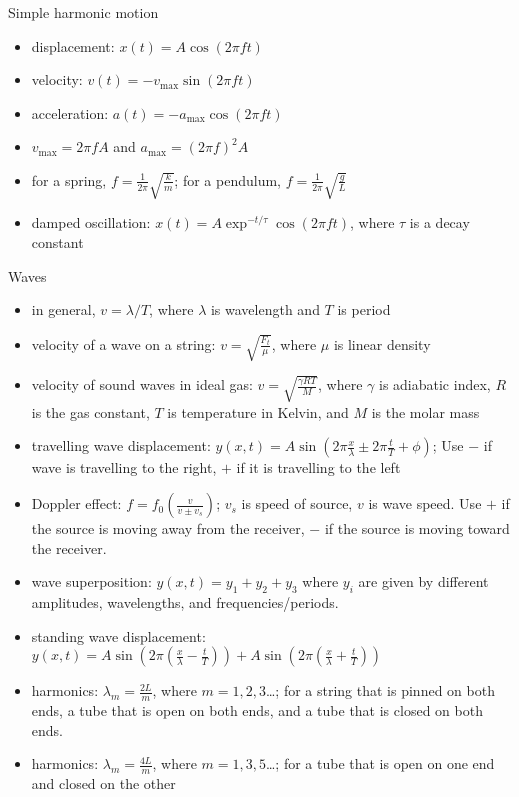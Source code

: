 \documentclass[11pt,letterpaper]{article}
\begin{document}
Simple harmonic motion
\begin{itemize}
\item displacement: $x(t)=A\cos(2\pi{f}t)$
\item velocity: $v(t)=-v_{\mathrm{max}}\sin(2\pi{f}t)$
\item acceleration: $a(t)=-a_{\mathrm{max}}\cos(2\pi{f}t)$
\item $v_{\mathrm{max}}=2\pi{f}A$ and $a_{\mathrm{max}}=(2\pi{f})^2A$
\item for a spring, $f=\frac{1}{2\pi}\sqrt{\frac{k}{m}}$; for a pendulum, $f=\frac{1}{2\pi}\sqrt{\frac{g}{L}}$
\item damped oscillation: $x(t)=A\exp^{-t/\tau}\cos(2\pi{f}t)$, where $\tau$ is a decay constant
\end{itemize}
Waves
\begin{itemize}
\item in general, $v=\lambda/T$, where $\lambda$ is wavelength and $T$ is period
\item velocity of a wave on a string: $v=\sqrt{\frac{F_t}{\mu}}$, where $\mu$ is linear density
\item velocity of sound waves in ideal gas: $v=\sqrt{\frac{\gamma{RT}}{M}}$, where $\gamma$ is adiabatic index, $R$ is the gas constant, $T$ is temperature in Kelvin, and $M$ is the molar mass
\item travelling wave displacement: $y(x,t)=A\sin\left(2\pi\frac{x}{\lambda}\pm 2\pi\frac{t}{T}+\phi\right)$; Use $-$ if wave is travelling to the right, $+$ if it is travelling to the left
\item Doppler effect: $f=f_0\displaystyle\left(\frac{v}{v\pm{v_s}}\right)$; $v_s$ is speed of source, $v$ is wave speed. Use $+$ if the source is moving away from the receiver, $-$ if the source is moving toward the receiver.
\item wave superposition: $y(x,t)=y_1+y_2+y_3$ where $y_i$ are given by different amplitudes, wavelengths, and frequencies/periods.
\item standing wave displacement: $y(x,t)=A\sin\left(2\pi\left(\frac{x}{\lambda}-\frac{t}{T}\right)\right)+A\sin\left(2\pi\left(\frac{x}{\lambda}+\frac{t}{T}\right)\right)$
\item harmonics: $\lambda_m=\frac{2L}{m}$, where $m=1,2,3$\ldots; for a string that is pinned on both ends, a tube that is open on both ends, and a tube that is closed on both ends.
\item harmonics: $\lambda_m=\frac{4L}{m}$, where $m=1,3,5$\ldots; for a tube that is open on one end and closed on the other
\end{itemize}
\end{document}
